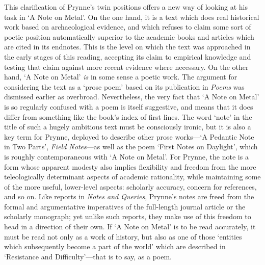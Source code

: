 \documentclass[]{article}
\begin{document}
This clarification of Prynne's twin positions offers a new way of
looking at his task in `A Note on Metal'. On the one hand, it is a text
which does real historical work based on archaeological evidence, and
which refuses to claim some sort of poetic position automatically
superior to the academic books and articles which are cited in its
endnotes. This is the level on which the text was approached in the
early stages of this reading, accepting its claim to empirical knowledge
and testing that claim against more recent evidence where necessary. On
the other hand, `A Note on Metal' \emph{is} in some sense a poetic work.
The argument for considering the text as a `prose poem' based on its
publication in \emph{Poems} was dismissed earlier as overbroad.
Nevertheless, the very fact that `A Note on Metal' is so regularly
confused with a poem is itself suggestive, and means that it does differ
from something like the book's index of first lines. The word `note' in
the title of such a hugely ambitious text must be consciously ironic,
but it is also a key term for Prynne, deployed to describe other prose
works---`A Pedantic Note in Two Parts', \emph{Field Notes}---as well as
the poem `First Notes on Daylight', which is roughly contemporaneous
with `A Note on Metal'. For Prynne, the note is a form whose apparent
modesty also implies flexibility and freedom from the more
teleologically determinant aspects of academic rationality, while
maintaining some of the more useful, lower-level aspects: scholarly
accuracy, concern for references, and so on. Like reports in \emph{Notes
and Queries}, Prynne's notes are freed from the formal and argumentative
imperatives of the full-length journal article or the scholarly
monograph; yet unlike such reports, they make use of this freedom to
head in a direction of their own. If `A Note on Metal' is to be read
accurately, it must be read not only as a work of history, but also as
one of those `entities which subsequently become a part of the world'
which are described in `Resistance and Difficulty'---that is to say, as
a poem.
\end{document}
